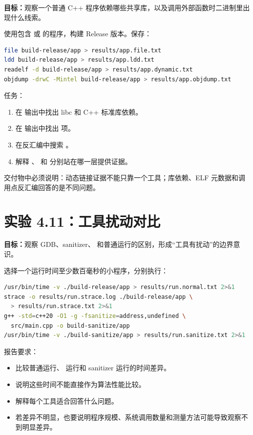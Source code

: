\begin{labbox}
\textbf{目标：}观察一个普通 C++ 程序依赖哪些共享库，以及调用外部函数时二进制里出现什么线索。

使用包含  或  的程序，构建 Release 版本。保存：

\begin{lstlisting}[language=bash]
file build-release/app > results/app.file.txt
ldd build-release/app > results/app.ldd.txt
readelf -d build-release/app > results/app.dynamic.txt
objdump -drwC -Mintel build-release/app > results/app.objdump.txt
\end{lstlisting}

任务：

\begin{enumerate}
  \item 在  输出中找出 libc 和 C++ 标准库依赖。
  \item 在  输出中找出  项。
  \item 在反汇编中搜索 。
  \item 解释 、 和  分别站在哪一层提供证据。
\end{enumerate}

交付物中必须说明：动态链接证据不能只靠一个工具；库依赖、ELF 元数据和调用点反汇编回答的是不同问题。
\end{labbox}

\section{实验 4.11：工具扰动对比}

\begin{labbox}
\textbf{目标：}观察 GDB、sanitizer、 和普通运行的区别，形成“工具有扰动”的边界意识。

选择一个运行时间至少数百毫秒的小程序，分别执行：

\begin{lstlisting}[language=bash]
/usr/bin/time -v ./build-release/app > results/run.normal.txt 2>&1
strace -o results/run.strace.log ./build-release/app \
  > results/run.strace.txt 2>&1
g++ -std=c++20 -O1 -g -fsanitize=address,undefined \
  src/main.cpp -o build-sanitize/app
/usr/bin/time -v ./build-sanitize/app > results/run.sanitize.txt 2>&1
\end{lstlisting}

报告要求：

\begin{itemize}
  \item 比较普通运行、 运行和 sanitizer 运行的时间差异。
  \item 说明这些时间不能直接作为算法性能比较。
  \item 解释每个工具适合回答什么问题。
  \item 若差异不明显，也要说明程序规模、系统调用数量和测量方法可能导致观察不到明显差异。
\end{itemize}
\end{labbox}

